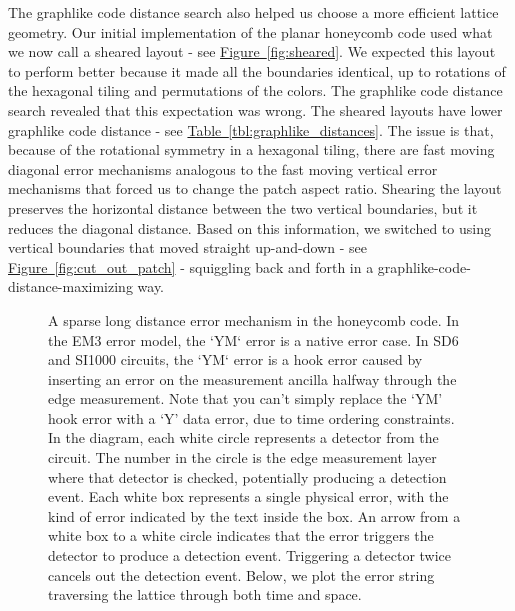 \documentclass[onecolumn,unpublished,a4paper]{quantumarticle}
\theoremstyle{definition}
\theoremstyle{definition}
\theoremstyle{definition}
\newcommand{\fig}[1]{\hyperref[fig:#1]{Figure~\ref*{fig:#1}}}
\newcommand{\tbl}[1]{\hyperref[tbl:#1]{Table~\ref*{tbl:#1}}}
\begin{document}
The graphlike code distance search also helped us choose a more efficient lattice geometry.
Our initial implementation of the planar honeycomb code used what we now call a sheared layout - see \fig{sheared}.
We expected this layout to perform better because it made all the boundaries identical, up to rotations of the hexagonal tiling and permutations of the colors.
The graphlike code distance search revealed that this expectation was wrong.
The sheared layouts have lower graphlike code distance - see \tbl{graphlike_distances}.
The issue is that, because of the rotational symmetry in a hexagonal tiling, there are fast moving diagonal error mechanisms analogous to the fast moving vertical error mechanisms that forced us to change the patch aspect ratio.
Shearing the layout preserves the horizontal distance between the two vertical boundaries, but it reduces the diagonal distance.
Based on this information, we switched to using vertical boundaries that moved straight up-and-down - see \fig{cut_out_patch} - squiggling back and forth in a graphlike-code-distance-maximizing way.

\begin{figure}[ht!]
    \centering
    \caption{
    A sparse long distance error mechanism in the honeycomb code.
    In the EM3 error model, the `YM` error is a native error case.
    In SD6 and SI1000 circuits, the `YM` error is a hook error caused by inserting an error on the measurement ancilla halfway through the edge measurement.
    Note that you can't simply replace the `YM' hook error with a `Y' data error, due to time ordering constraints.
    In the diagram, each white circle represents a detector from the circuit.
    The number in the circle is the edge measurement layer where that detector is checked, potentially producing a detection event.
    Each white box represents a single physical error, with the kind of error indicated by the text inside the box.
    An arrow from a white box to a white circle indicates that the error triggers the detector to produce a detection event.
    Triggering a detector twice cancels out the detection event.  Below, we plot the error string traversing the lattice through both time and space.
    }
    \label{fig:bad_error}
\end{figure}
\end{document}
